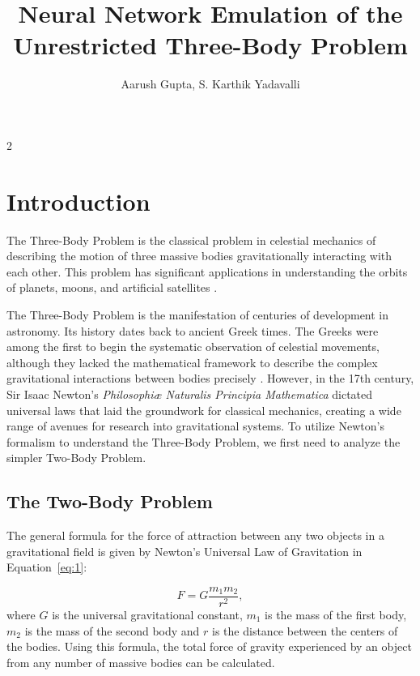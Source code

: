 \documentclass{article}
\title{Neural Network Emulation of the Unrestricted Three-Body Problem }
\author{Aarush Gupta, S. Karthik Yadavalli}
\begin{document}
\maketitle

\begin{multicols}{2} %

\section{Introduction}
\label{sec:introduction}
The Three-Body Problem is the classical problem in celestial mechanics of describing the motion of three massive bodies gravitationally interacting with each other. This problem has significant applications in understanding the orbits of planets, moons, and artificial satellites \citep{gardner2006james}.

The Three-Body Problem is the manifestation of centuries of development in astronomy. Its history dates back to ancient Greek times. The Greeks were among the first to begin the systematic observation of celestial movements, although they lacked the mathematical framework to describe the complex gravitational interactions between bodies precisely \citep{anjum2020timelinegravity}. However, in the 17th century, Sir Isaac Newton’s \textit{Philosophiæ Naturalis Principia Mathematica} \citep{newton1687principia, cohen1999principia} dictated universal laws that laid the groundwork for classical mechanics, creating a wide range of avenues for research into gravitational systems. To utilize Newton's formalism to understand the Three-Body Problem, we first need to analyze the simpler Two-Body Problem.

\subsection{The Two-Body Problem}
\label{subsec:2bp}
The general formula for the force of attraction between any two objects in a gravitational field is given by Newton’s Universal Law of Gravitation in Equation~\ref{eq:1}:

\begin{equation}
    F=G\frac{m_1m_2}{r^2},
    \label{eq:1}
\end{equation}
where $G$ is the universal gravitational constant, $m_1$ is the mass of the first body, $m_2$ is the mass of the second body and $r$ is the distance between the centers of the bodies. Using this formula, the total force of gravity experienced by an object from any number of massive bodies can be calculated.


\end{multicols}
\end{document}
